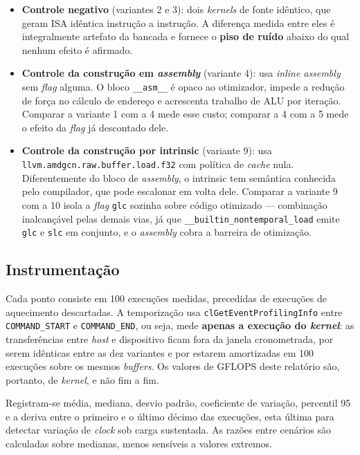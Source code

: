 \documentclass[12pt]{article}
\begin{document}
\begin{itemize}
\item \textbf{Controle negativo} (variantes 2 e 3): dois \textit{kernels} de
fonte idêntico, que geram ISA idêntica instrução a instrução. A diferença
medida entre eles é integralmente artefato da bancada e fornece o \textbf{piso
de ruído} abaixo do qual nenhum efeito é afirmado.

\item \textbf{Controle da construção em \textit{assembly}} (variante 4): usa
\textit{inline assembly} sem \textit{flag} alguma. O bloco \texttt{\_\_asm\_\_}
é opaco ao otimizador, impede a redução de força no cálculo de endereço e
acrescenta trabalho de ALU por iteração. Comparar a variante 1 com a 4 mede esse
custo; comparar a 4 com a 5 mede o efeito da \textit{flag} já descontado dele.

\item \textbf{Controle da construção por intrinsic} (variante 9): usa
\texttt{llvm.amdgcn.raw.buffer.load.f32} com política de \textit{cache} nula.
Diferentemente do bloco de \textit{assembly}, o intrinsic tem semântica
conhecida pelo compilador, que pode escalonar em volta dele. Comparar a variante
9 com a 10 isola a \textit{flag} \texttt{glc} sozinha sobre código otimizado ---
combinação inalcançável pelas demais vias, já que \texttt{\_\_builtin\_nontemporal\_load}
emite \texttt{glc} e \texttt{slc} em conjunto, e o \textit{assembly} cobra a
barreira de otimização.
\end{itemize}

\subsection{Instrumentação}

Cada ponto consiste em 100 execuções medidas, precedidas de execuções de
aquecimento descartadas. A temporização usa \texttt{clGetEventProfilingInfo}
entre \texttt{COMMAND\_START} e \texttt{COMMAND\_END}, ou seja, mede
\textbf{apenas a execução do \textit{kernel}}: as transferências entre
\textit{host} e dispositivo ficam fora da janela cronometrada, por serem
idênticas entre as dez variantes e por estarem amortizadas em 100 execuções
sobre os mesmos \textit{buffers}. Os valores de GFLOPS deste relatório são,
portanto, de \textit{kernel}, e não fim a fim.

Registram-se média, mediana, desvio padrão, coeficiente de variação, percentil
95 e a deriva entre o primeiro e o último décimo das execuções, esta última para
detectar variação de \textit{clock} sob carga sustentada. As razões entre
cenários são calculadas sobre medianas, menos sensíveis a valores extremos.
\end{document}
